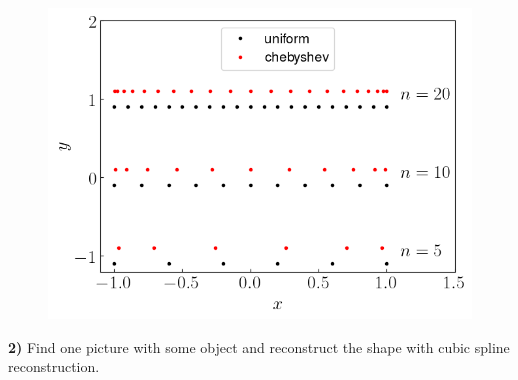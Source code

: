 \documentclass[12pt,a4paper]{article}
\newcommand{\prob}[2]{\textbf{#1)} #2}
\begin{document}
\begin{figure}[H]
    \begin{center}
        \includegraphics[scale=0.75]{./fig3.png} 
    \end{center}
\end{figure}

\prob{2}{Find one picture with some object and reconstruct the shape with cubic spline reconstruction.}
\end{document}
